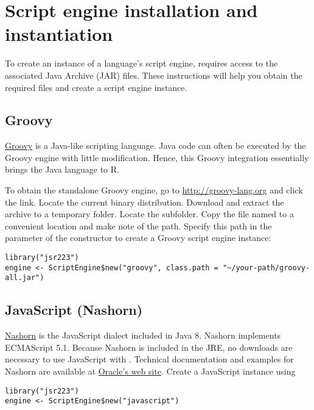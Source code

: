 \hypertarget{scriptengineinstallation}{\section{Script engine installation and instantiation}}

To create an instance of a language's script engine,  requires access to the associated Java Archive (JAR) files. These instructions will help you obtain the required files and create a script engine instance.

\subsection{Groovy}

\href{http://groovy-lang.org}{Groovy} is a Java-like scripting language. Java code can often be executed by the Groovy engine with little modification. Hence, this Groovy integration essentially brings the Java language to R.

To obtain the standalone Groovy engine, go to \url{http://groovy-lang.org} and click the  link. Locate the current binary distribution. Download and extract the archive to a temporary folder. Locate the  subfolder. Copy the file named  to a convenient location and make note of the path. Specify this path in the  parameter of the  constructor to create a Groovy script engine instance:

\begin{verbatim}
library("jsr223")
engine <- ScriptEngine$new("groovy", class.path = "~/your-path/groovy-all.jar")
\end{verbatim}

\subsection{JavaScript (Nashorn)}

\href{https://docs.oracle.com/javase/8/docs/technotes/guides/scripting/nashorn/}{Nashorn} is the JavaScript dialect included in Java 8. Nashorn implements ECMAScript 5.1. Because Nashorn is included in the JRE, no downloads are necessary to use JavaScript with . Technical documentation and examples for Nashorn are available at \href{https://docs.oracle.com/javase/8/docs/technotes/guides/scripting/nashorn/}{Oracle's web site}. Create a JavaScript instance using

\begin{verbatim}
library("jsr223")
engine <- ScriptEngine$new("javascript")
\end{verbatim}

